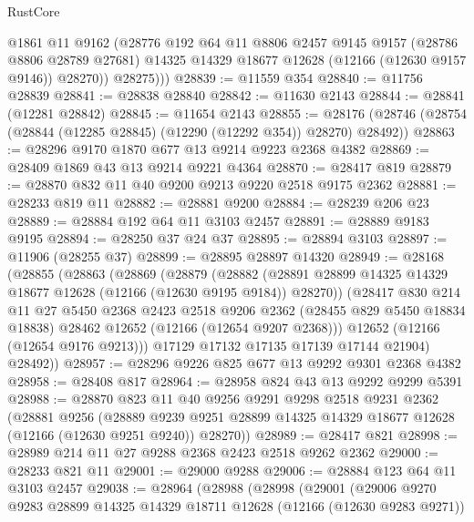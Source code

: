 \begin{lexlean}{RustCore}
\begin{coremodule}
            @1861
            @11
            @9162
            (@28776
              @192
              @64
              @11
              @8806
              @2457
              @9145
              @9157
              (@28786 @8806 @28789 @27681)
              @14325
              @14329
              @18677
              @12628
              (@12166 (@12630 @9157 @9146))
              @28270))
          @28275)))
@28839 := @11559 @354
@28840 := @11756 @28839
@28841 := @28838 @28840
@28842 := @11630 @2143
@28844 := @28841 (@12281 @28842)
@28845 := @11654 @2143
@28855 := @28176 (@28746 (@28754 (@28844 (@12285 @28845) (@12290 (@12292 @354)) @28270) @28492))
@28863 := @28296 @9170 @1870 @677 @13 @9214 @9223 @2368 @4382
@28869 := @28409 @1869 @43 @13 @9214 @9221 @4364
@28870 := @28417 @819
@28879 := @28870 @832 @11 @40 @9200 @9213 @9220 @2518 @9175 @2362
@28881 := @28233 @819 @11
@28882 := @28881 @9200
@28884 := @28239 @206 @23
@28889 := @28884 @192 @64 @11 @3103 @2457
@28891 := @28889 @9183 @9195
@28894 := @28250 @37 @24 @37
@28895 := @28894 @3103
@28897 := @11906 (@28255 @37)
@28899 := @28895 @28897 @14320
@28949 := @28168
    (@28855
      (@28863
        (@28869
          (@28879
            (@28882
              (@28891 @28899 @14325 @14329 @18677 @12628 (@12166 (@12630 @9195 @9184)) @28270))
            (@28417
              @830
              @214
              @11
              @27
              @5450
              @2368
              @2423
              @2518
              @9206
              @2362
              (@28455 @829 @5450 @18834 @18838)
              @28462
              @12652
              (@12166 (@12654 @9207 @2368)))
            @12652
            (@12166 (@12654 @9176 @9213)))
          @17129
          @17132
          @17135
          @17139
          @17144
          @21904)
        @28492))
@28957 := @28296 @9226 @825 @677 @13 @9292 @9301 @2368 @4382
@28958 := @28408 @817
@28964 := @28958 @824 @43 @13 @9292 @9299 @5391
@28988 := @28870
    @823
    @11
    @40
    @9256
    @9291
    @9298
    @2518
    @9231
    @2362
    (@28881
      @9256
      (@28889 @9239 @9251 @28899 @14325 @14329 @18677 @12628 (@12166 (@12630 @9251 @9240)) @28270))
@28989 := @28417 @821
@28998 := @28989 @214 @11 @27 @9288 @2368 @2423 @2518 @9262 @2362
@29000 := @28233 @821 @11
@29001 := @29000 @9288
@29006 := @28884 @123 @64 @11 @3103 @2457
@29038 := @28964
    (@28988
      (@28998
        (@29001
          (@29006
            @9270
            @9283
            @28899
            @14325
            @14329
            @18711
            @12628
            (@12166 (@12630 @9283 @9271))

\end{coremodule}
\end{lexlean}
